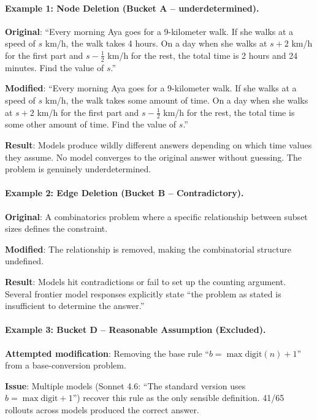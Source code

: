 \documentclass{article} %
\begin{document}
\paragraph{Example 1: Node Deletion (Bucket A -- underdetermined).}

\textbf{Original}: ``Every morning Aya goes for a 9-kilometer walk. If she walks at a speed of $s$ km/h, the walk takes 4 hours. On a day when she walks at $s+2$ km/h for the first part and $s-\frac{1}{2}$ km/h for the rest, the total time is 2 hours and 24 minutes. Find the value of $s$.''

\textbf{Modified}: ``Every morning Aya goes for a 9-kilometer walk. If she walks at a speed of $s$ km/h, the walk takes some amount of time. On a day when she walks at $s+2$ km/h for the first part and $s-\frac{1}{2}$ km/h for the rest, the total time is some other amount of time. Find the value of $s$.''

\textbf{Result}: Models produce wildly different answers depending on which time values they assume. No model converges to the original answer without guessing. The problem is genuinely underdetermined.

\paragraph{Example 2: Edge Deletion (Bucket B -- Contradictory).}

\textbf{Original}: A combinatorics problem where a specific relationship between subset sizes defines the constraint.

\textbf{Modified}: The relationship is removed, making the combinatorial structure undefined.

\textbf{Result}: Models hit contradictions or fail to set up the counting argument. Several frontier model responses explicitly state ``the problem as stated is insufficient to determine the answer.''

\paragraph{Example 3: Bucket D -- Reasonable Assumption (Excluded).}

\textbf{Attempted modification}: Removing the base rule ``$b = \max\text{digit}(n) + 1$'' from a base-conversion problem.

\textbf{Issue}: Multiple models (Sonnet 4.6: ``The standard version uses $b = \max\text{digit} + 1$'') recover this rule as the only sensible definition. 41/65 rollouts across models produced the correct answer.
\end{document}
